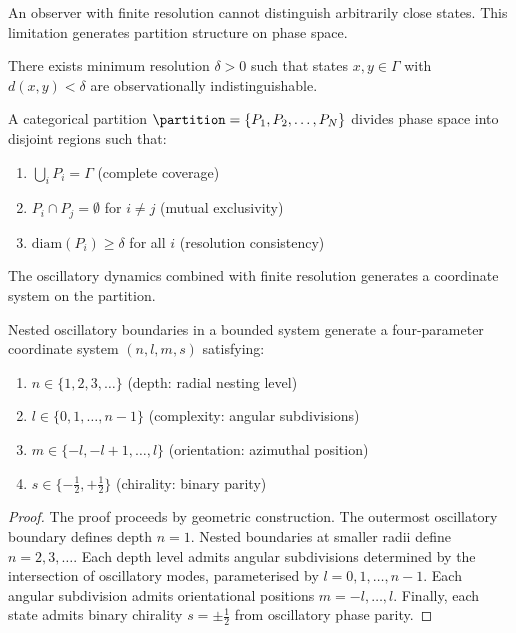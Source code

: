 An observer with finite resolution cannot distinguish arbitrarily close states. This limitation generates partition structure on phase space.

\begin{axiom}
\label{ax:resolution}
There exists minimum resolution $\delta > 0$ such that states $x, y \in \Gamma$ with $d(x, y) < \delta$ are observationally indistinguishable.
\end{axiom}

\begin{definition}
\label{def:categorical_partition}
A categorical partition $\partition = \{P_1, P_2, \ldots, P_N\}$ divides phase space into disjoint regions such that:
\begin{enumerate}
\item $\bigcup_i P_i = \Gamma$ (complete coverage)
\item $P_i \cap P_j = \emptyset$ for $i \neq j$ (mutual exclusivity)
\item $\mathrm{diam}(P_i) \geq \delta$ for all $i$ (resolution consistency)
\end{enumerate}
\end{definition}

The oscillatory dynamics combined with finite resolution generates a coordinate system on the partition.

\begin{theorem}
\label{thm:partition_coords}
Nested oscillatory boundaries in a bounded system generate a four-parameter coordinate system $(n, l, m, s)$ satisfying:
\begin{enumerate}
\item $n \in \{1, 2, 3, \ldots\}$ (depth: radial nesting level)
\item $l \in \{0, 1, \ldots, n-1\}$ (complexity: angular subdivisions)
\item $m \in \{-l, -l+1, \ldots, l\}$ (orientation: azimuthal position)
\item $s \in \{-\frac{1}{2}, +\frac{1}{2}\}$ (chirality: binary parity)
\end{enumerate}
\end{theorem}

\begin{proof}
The proof proceeds by geometric construction. The outermost oscillatory boundary defines depth $n = 1$. Nested boundaries at smaller radii define $n = 2, 3, \ldots$. Each depth level admits angular subdivisions determined by the intersection of oscillatory modes, parameterised by $l = 0, 1, \ldots, n-1$. Each angular subdivision admits orientational positions $m = -l, \ldots, l$. Finally, each state admits binary chirality $s = \pm\frac{1}{2}$ from oscillatory phase parity.
\end{proof}

